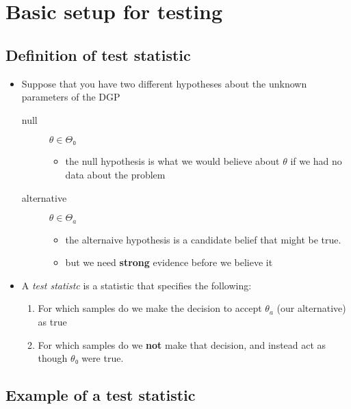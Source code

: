 \section{Basic setup for testing}

\subsection{Definition of test statistic}

\begin{itemize}
\item Suppose that you have two different hypotheses about the
       unknown parameters of the DGP
\begin{description}
\item[null] $θ ∈ Θ₀$
\begin{itemize}
\item the null hypothesis is what we would believe about $θ$ if we
           had no data about the problem
\end{itemize}
\item[alternative] $θ ∈ Θ_a$
\begin{itemize}
\item the alternaive hypothesis is a candidate belief that might be true.
\item but we need \textbf{strong} evidence before we believe it
\end{itemize}
\end{description}
\item A \emph{test statistc} is a statistic that specifies the following:
\begin{enumerate}
\item For which samples do we make the decision to accept $θ_a$
          (our alternative) as true
\item For which samples do we \textbf{not} make that decision, and instead
          act as though $θ₀$ were true.
\end{enumerate}
\end{itemize}

\subsection{Example of a test statistic}

